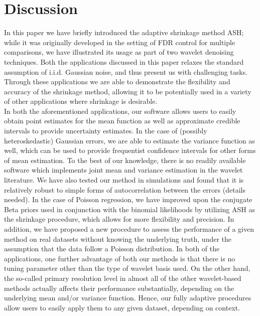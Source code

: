 \documentclass[12pt]{article}
\begin{document}
\section{Discussion}
In this paper we have briefly introduced the adaptive shrinkage method ASH; while it was originally developed in the setting of FDR control for multiple comparisons, we have illustrated its usage as part of two wavelet denoising techniques. Both the applications discussed in this paper relaxes the standard assumption of i.i.d. Gaussian noise, and thus present us with challenging tasks. Through these applications we are able to demonstrate the flexibility and accuracy of the shrinkage method, allowing it to be potentially used in a variety of other applications where shrinkage is desirable.\bigskip\\
In both the aforementioned applications, our software allows users to easily obtain point estimates for the mean function as well as approximate credible intervals to provide uncertainty estimates. In the case of (possibly heteroskedastic) Gaussian errors, we are able to estimate the variance function as well, which can be used to provide frequentist confidence intervals for other forms of mean estimation. To the best of our knowledge, there is no readily available software which implements joint mean and variance estimation in the wavelet literature. We have also tested our method in simulations and found that it is relatively robust to simple forms of autocorrelation between the errors (details needed). In the case of Poisson regression, we have improved upon the conjugate Beta priors used in conjunction with the binomial likelihoods by utilizing ASH as the shrinkage procedure, which allows for more flexibility and precision. In addition, we have proposed a new procedure to assess the performance of a given method on real datasets without knowing the underlying truth, under the assumption that the data follow a Poisson distribution. In both of the applications, one further advantage of both our methods is that there is no tuning parameter other than the type of wavelet basis used. On the other hand, the so-called primary resolution level in almost all of the other wavelet-based methods actually affects their performance substantially, depending on the underlying mean and/or variance function. Hence, our fully adaptive procedures allow users to easily apply them to any given dataset, depending on context.\bigskip\\
\end{document}
